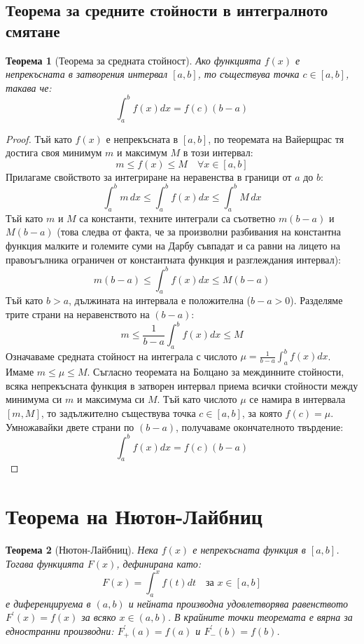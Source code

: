 \documentclass{scrartcl}
\newtheorem{theorem}{Теорема}
\begin{document}
\begin{FlushLeft}
\subsection{Теорема за средните стойности в интегралното смятане}

\begin{theorem}[Теорема за средната стойност]\label{thm:mean-value}
Ако функцията $f(x)$ е непрекъсната в затворения интервал $[a, b]$, то съществува точка $c \in [a, b]$, такава че:
\[ \int_a^b f(x)dx = f(c)(b - a) \]
\end{theorem}

\begin{proof}
Тъй като $f(x)$ е непрекъсната в $[a, b]$, по теоремата на Вайерщрас тя достига своя минимум $m$ и максимум $M$ в този интервал:
\[ m \le f(x) \le M \quad \forall x \in [a, b] \]
Прилагаме свойството за интегриране на неравенства в граници от $a$ до $b$:
\[ \int_a^b m \, dx \le \int_a^b f(x)dx \le \int_a^b M \, dx \]
Тъй като $m$ и $M$ са константи, техните интеграли са съответно $m(b-a)$ и $M(b-a)$ (това следва от факта, че за произволни разбивания на константна функция малките и големите суми на Дарбу съвпадат и са равни на лицето на правоъгълника ограничен от константната функция и разглеждания интервал):
\[ m(b-a) \le \int_a^b f(x)dx \le M(b-a) \]
Тъй като $b > a$, дължината на интервала е положителна ($b-a > 0$). Разделяме трите страни на неравенството на $(b-a)$:
\[ m \le \frac{1}{b-a}\int_a^b f(x)dx \le M \]
Означаваме средната стойност на интеграла с числото $\mu = \frac{1}{b-a}\int_a^b f(x)dx$. Имаме $m \le \mu \le M$. Съгласно теоремата на Болцано за междинните стойности, всяка непрекъсната функция в затворен интервал приема всички стойности между минимума си $m$ и максимума си $M$. Тъй като числото $\mu$ се намира в интервала $[m, M]$, то задължително съществува точка $c \in [a, b]$, за която $f(c) = \mu$. Умножавайки двете страни по $(b-a)$, получаваме окончателното твърдение:
\[ \int_a^b f(x)dx = f(c)(b - a) \]
\end{proof}

\section{Теорема на Нютон-Лайбниц}

\begin{theorem}[Нютон-Лайбниц]\label{thm:nl-derivative}
Нека $f(x)$ е непрекъсната функция в $[a, b]$. Тогава функцията $F(x)$, дефинирана като:
\[ F(x) = \int_a^x f(t)dt \quad \text{за } x \in [a, b] \]
е диференцируема в $(a, b)$ и нейната производна удовлетворява равенството $F^{\prime}(x) = f(x)$ за всяко $x \in (a, b)$. В крайните точки теоремата е вярна за едностранни производни: $F^{\prime}_+(a) = f(a)$ и $F^{\prime}_-(b) = f(b)$.
\end{theorem}


\end{FlushLeft}
\end{document}
